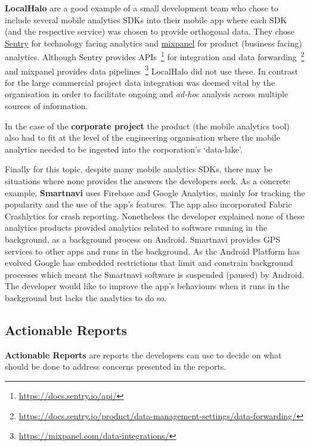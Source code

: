 \textbf{LocalHalo} are a good example of a small development team who chose to include several mobile analytics SDKs into their mobile app where each SDK (and the respective service) was chosen to provide orthogonal data. They chose \href{https://sentry.io/}{Sentry} for technology facing analytics and \href{https://mixpanel.com/}{mixpanel} for product (business facing) analytics. Although Sentry provides APIs~\footnote{\url{https://docs.sentry.io/api/}} for integration and data forwarding~\footnote{\url{https://docs.sentry.io/product/data-management-settings/data-forwarding/}} and mixpanel provides data pipelines~\footnote{\url{https://mixpanel.com/data-integrations/}} LocalHalo did not use these. In contrast for the large commercial project data integration was deemed vital by the organisation in order to facilitate ongoing and \emph{ad-hoc} analysis across multiple sources of information. 

In the case of the \textbf{corporate project} the product (the mobile analytics tool) also had to fit at the level of the engineering organisation where the mobile analytics needed to be ingested into the corporation's `data-lake'. 

Finally for this topic, despite many mobile analytics SDKs, there may be situations where none provides the answers the developers seek. As a concrete example, \textbf{Smartnavi} uses Firebase and Google Analytics, mainly for tracking the popularity and the use of the app's features. The app also incorporated Fabric Crashlytics for crash reporting. Nonetheless the developer explained none of these analytics products provided analytics related to software running in the background, as a background process on Android. Smartnavi provides GPS services to other apps and runs in the background. As the Android Platform has evolved Google has embedded restrictions that limit and constrain background processes which meant the Smartnavi software is suspended (paused) by Android. The developer would like to improve the app's behaviours when it runs in the background but lacks the analytics to do so.


\subsection{Actionable Reports}
\textbf{Actionable Reports} are reports the developers can use to decide on what should be done to address concerns presented in the reports. %

